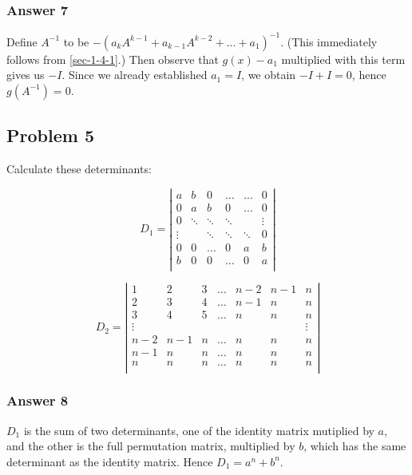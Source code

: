 \documentclass[11pt]{article}
\begin{document}
\subsubsection{Answer 7}
\label{sec-1-4-2}
Define $A^{-1}$ to be $-(a_kA^{k-1}+a_{k-1}A^{k-2}+...+a_1)^{-1}$.  (This
immediately follows from \ref{sec-1-4-1}.)  Then observe that $g(x) - a_1$ multiplied
with this term gives us $-I$.  Since we already established $a_1=I$, we
obtain $-I+I=0$, hence $g(A^{-1})=0$.
\subsection{Problem 5}
\label{sec-1-5}
Calculate these determinants:

\begin{equation*}
  D_1 = \left|
    \begin{array}{cccccc}
      a      & b      & 0      & \hdots & \hdots & 0 \\
      0      & a      & b      & 0      & \hdots & 0 \\
      0      & \ddots & \ddots & \ddots &        & \vdots \\
      \vdots &        & \ddots & \ddots & \ddots & 0 \\
      0      & 0      & \hdots & 0      & a      & b \\
      b      & 0      & 0      & \hdots & 0      & a \\
    \end{array}
  \right|
\end{equation*}

\begin{equation*}
  D_2 = \left|
    \begin{array}{ccccccc}
      1      & 2   & 3 & \hdots & n-2 & n-1 & n \\
      2      & 3   & 4 & \hdots & n-1 & n   & n \\
      3      & 4   & 5 & \hdots & n   & n   & n \\
      \vdots &     &   &        &     &     & \vdots \\
      n-2    & n-1 & n & \hdots & n   & n   & n \\
      n-1    & n   & n & \hdots & n   & n   & n \\
      n      & n   & n & \hdots & n   & n   & n \\
    \end{array}
  \right|
\end{equation*}

\subsubsection{Answer 8}
\label{sec-1-5-1}
$D_1$ is the sum of two determinants, one of the identity matrix mutiplied
by $a$, and the other is the full permutation matrix, multiplied by $b$,
which has the same determinant as the identity matrix.  Hence $D_1=a^n+b^n$.
\end{document}
